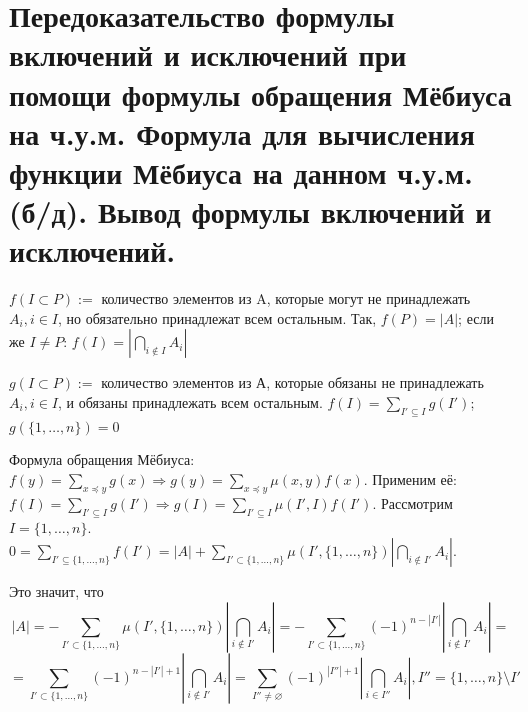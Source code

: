\section{Передоказательство формулы включений и исключений при помощи формулы обращения Мёбиуса на ч.у.м. Формула для вычисления функции Мёбиуса на данном ч.у.м.(б/д). Вывод формулы включений и исключений.}

$f(I \subset P) :=$ количество элементов из A, которые могут не принадлежать $A_i, i \in I$, но обязательно принадлежат всем остальным. Так, $f(P) = |A|$; если же $I \neq P$: $f(I) = |\bigcap_{i \notin I} A_i|$ \par
$g(I \subset P) :=$ количество элементов из А, которые обязаны не принадлежать $A_i, i \in I$, и обязаны принадлежать всем остальным. $f(I) = \sum_{I' \subseteq I} g(I')$; $g(\{1, \dots, n\}) = 0$\par 
Формула обращения Мёбиуса: $f(y) = \sum_{x\preceq y}g(x) \Rightarrow g(y) = \sum_{x \preceq y} \mu(x, y)f(x)$. Применим её:
$ f(I) = \sum_{I' \subseteq I}g(I') \Rightarrow g(I) = \sum_{I' \subseteq I} \mu(I', I)f(I')$.
Рассмотрим $I = \{1, \dots, n\}$. $0 = \sum_{I' \subseteq \{1, \dots, n\}}f(I') = |A| + \sum_{I' \subset \{1, \dots, n\}}\mu(I', \{1, \dots, n\})|\bigcap_{i \notin I'} A_i|$. \par
Это значит, что 
\[ |A| = - \sum_{I' \subset \{1, \dots, n\}}\mu(I', \{1, \dots, n\})|\bigcap_{i \notin I'} A_i| = - \sum_{I' \subset \{1, \dots, n\}} (-1)^{n-|I'|} |\bigcap_{i \notin I'} A_i| =\] \[= \sum_{I' \subset \{1, \dots, n\}} (-1)^{n-|I'| + 1} |\bigcap_{i \notin I'} A_i| = \sum_{I'' \neq \varnothing} (-1)^{|I''|+1} |\bigcap_{i \in I''} A_i|, I'' = \{1, \dots, n\} \setminus I'\]